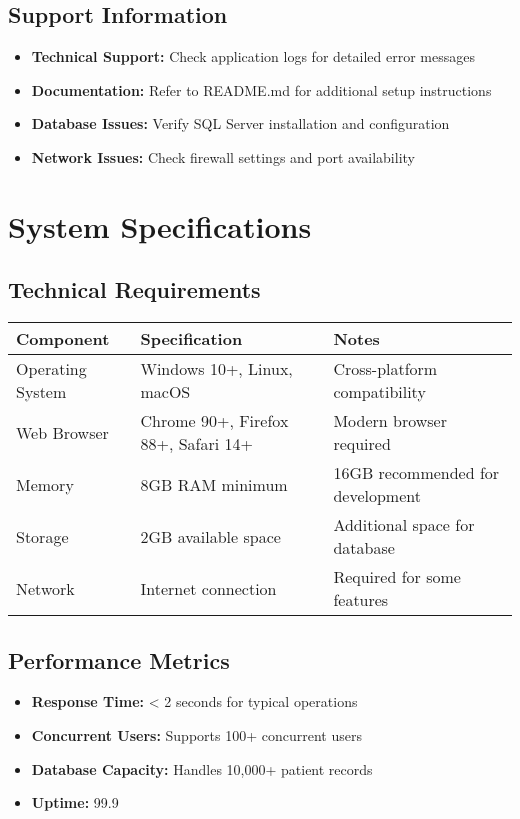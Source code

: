\documentclass[12pt,a4paper]{article}
\begin{document}
\subsection{Support Information}

\begin{itemize}
    \item \textbf{Technical Support:} Check application logs for detailed error messages
    \item \textbf{Documentation:} Refer to README.md for additional setup instructions
    \item \textbf{Database Issues:} Verify SQL Server installation and configuration
    \item \textbf{Network Issues:} Check firewall settings and port availability
\end{itemize}

\section{System Specifications}

\subsection{Technical Requirements}

\begin{longtable}{|p{3cm}|p{4cm}|p{7cm}|}
\hline
\textbf{Component} & \textbf{Specification} & \textbf{Notes} \\
\hline
Operating System & Windows 10+, Linux, macOS & Cross-platform compatibility \\
\hline
Web Browser & Chrome 90+, Firefox 88+, Safari 14+ & Modern browser required \\
\hline
Memory & 8GB RAM minimum & 16GB recommended for development \\
\hline
Storage & 2GB available space & Additional space for database \\
\hline
Network & Internet connection & Required for some features \\
\hline
\end{longtable}

\subsection{Performance Metrics}

\begin{itemize}
    \item \textbf{Response Time:} < 2 seconds for typical operations
    \item \textbf{Concurrent Users:} Supports 100+ concurrent users
    \item \textbf{Database Capacity:} Handles 10,000+ patient records
    \item \textbf{Uptime:} 99.9%
\end{itemize}
\end{document}
